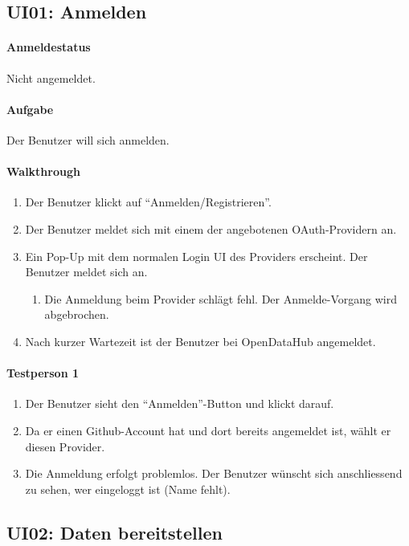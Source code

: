 \subsection{UI01: Anmelden}
\paragraph{Anmeldestatus} Nicht angemeldet.

\paragraph{Aufgabe} Der Benutzer will sich anmelden.

\paragraph{Walkthrough}
\begin{enumerate}
\item Der Benutzer klickt auf ``Anmelden/Registrieren''.
\item Der Benutzer meldet sich mit einem der angebotenen OAuth-Providern an.
\item Ein Pop-Up mit dem normalen Login UI des Providers erscheint. Der Benutzer meldet sich an.
  \begin{enumerate}[label=\labelenumi\alph*.]
  \item Die Anmeldung beim Provider schlägt fehl. Der Anmelde-Vorgang wird abgebrochen.
  \end{enumerate}
\item Nach kurzer Wartezeit ist der Benutzer bei OpenDataHub angemeldet.
\end{enumerate}

\paragraph{Testperson 1}
\begin{enumerate}
\item Der Benutzer sieht den ``Anmelden''-Button und klickt darauf.
\item Da er einen Github-Account hat und dort bereits angemeldet ist, wählt er diesen Provider.
\item Die Anmeldung erfolgt problemlos. Der Benutzer wünscht sich anschliessend zu sehen, wer eingeloggt ist (Name fehlt).
\end{enumerate}

\subsection{UI02: Daten bereitstellen}
